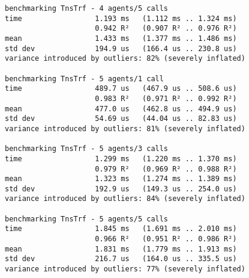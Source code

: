 \begin{verbatim}
benchmarking TnsTrf - 4 agents/5 calls
time                 1.193 ms   (1.112 ms .. 1.324 ms)
                     0.942 R²   (0.907 R² .. 0.976 R²)
mean                 1.433 ms   (1.377 ms .. 1.486 ms)
std dev              194.9 us   (166.4 us .. 230.8 us)
variance introduced by outliers: 82% (severely inflated)

benchmarking TnsTrf - 5 agents/1 call
time                 489.7 us   (467.9 us .. 508.6 us)
                     0.983 R²   (0.971 R² .. 0.992 R²)
mean                 477.0 us   (462.8 us .. 494.9 us)
std dev              54.69 us   (44.04 us .. 82.83 us)
variance introduced by outliers: 81% (severely inflated)

benchmarking TnsTrf - 5 agents/3 calls
time                 1.299 ms   (1.220 ms .. 1.370 ms)
                     0.979 R²   (0.969 R² .. 0.988 R²)
mean                 1.323 ms   (1.274 ms .. 1.389 ms)
std dev              192.9 us   (149.3 us .. 254.0 us)
variance introduced by outliers: 84% (severely inflated)

benchmarking TnsTrf - 5 agents/5 calls
time                 1.845 ms   (1.691 ms .. 2.010 ms)
                     0.966 R²   (0.951 R² .. 0.986 R²)
mean                 1.831 ms   (1.779 ms .. 1.913 ms)
std dev              216.7 us   (164.0 us .. 335.5 us)
variance introduced by outliers: 77% (severely inflated)

\end{verbatim}